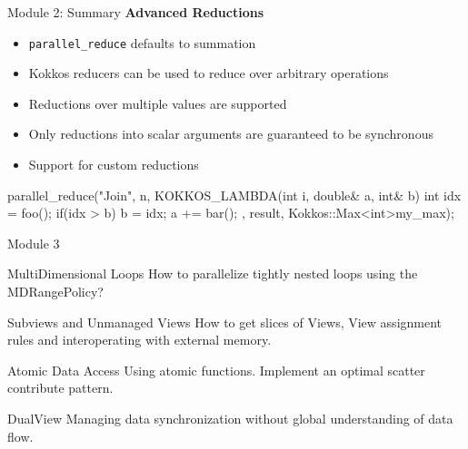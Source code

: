 \begin{frame}[fragile]{Module 2: Summary}
	\textbf{Advanced Reductions}
	\begin{itemize}
        \item \texttt{parallel\_reduce} defaults to summation
        \item Kokkos reducers can be used to reduce over arbitrary operations
        \item Reductions over multiple values are supported
        \item Only reductions into scalar arguments are guaranteed to be synchronous
        \item Support for custom reductions
	\end{itemize}

\begin{code}[keywords={View,int,CudaSpace}]
    parallel_reduce("Join", n,
      KOKKOS_LAMBDA(int i, double& a, int& b) {
        int idx = foo();
        if(idx > b) b = idx;
        a += bar();
      }, result, Kokkos::Max<int>{my_max});
\end{code}

\end{frame}

\begin{frame}{Module 3}
  \begin{block}{MultiDimensional Loops}
    How to parallelize tightly nested loops using the MDRangePolicy?
  \end{block}

  \begin{block}{Subviews and Unmanaged Views}
    How to get slices of Views, View assignment rules and interoperating with external memory.
  \end{block}

  \begin{block}{Atomic Data Access}
    Using atomic functions. Implement an optimal scatter contribute pattern.
  \end{block}

  \begin{block}{DualView}
    Managing data synchronization without global understanding of data flow.
  \end{block}
\end{frame}







